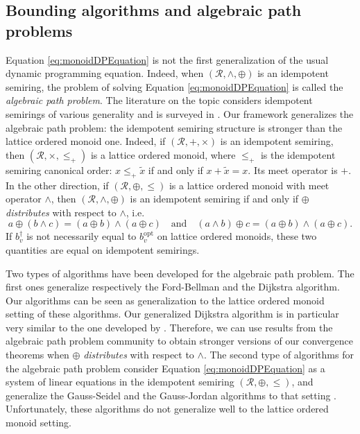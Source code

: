 \documentclass[11pt]{amsart}
\theoremstyle{plain}
\theoremstyle{remark}
\newcommand{\rplus}{\oplus}
\newcommand{\rleq}{\leqslant}
\newcommand{\rset}{\mathcal{R}}
\newcommand{\re}{x}
\newcommand{\meet}{\wedge} \newcommand{\bigmeet}{\bigwedge}
\begin{document}
\subsection{Bounding algorithms and algebraic path problems} \label{sub:bounding_algorithms_and_resource_constrained_shortest_path_problem}



Equation \eqref{eq:monoidDPEquation} is not the first generalization of the usual dynamic programming equation. Indeed, when $(\rset,\meet,\rplus)$ is an idempotent semiring, the problem of solving Equation \eqref{eq:monoidDPEquation} is called the \emph{algebraic path problem}. The literature on the topic considers idempotent semirings of various generality \cite{aho1974design,backhouse1975regular,carre1971algebra,zimmermann1981linear,fink1992survey,gondran2008graphs,lehmann1977algebraic,roy1959transitivite,mohri2002semiring} and is surveyed in \cite{fink1992survey}. Our framework generalizes the algebraic path problem:  the idempotent semiring structure is stronger than the lattice ordered monoid one. Indeed, if $(\rset,+,\times)$ is an idempotent semiring, then $(\rset,\times, \rleq_{+})$ is a lattice ordered monoid, where $\rleq_{+}$ is the idempotent semiring canonical order: $\re \rleq_{+}\tilde{\re}$ if and only if $\re + \tilde{\re} = \re$. Its meet operator is $+$. In the other direction, if $(\rset,\rplus,\rleq)$ is a lattice ordered monoid with meet operator $\meet$, then $(\rset,\meet,\rplus)$ is an idempotent semiring if and only if $\rplus$ \emph{distributes} with respect to $\meet$, i.e.
$$a \rplus (b \meet c) = (a \rplus b) \meet (a \rplus c)  \quad \text{and}\quad (a \meet b) \rplus c = (a\rplus b) \meet (a \rplus c).$$
\noindent If $b_{v}^{\dagger}$ is not necessarily equal to $b_{v}^{\mathrm{opt}}$ on lattice ordered monoids, these two quantities are equal on idempotent semirings.

Two types of algorithms have been developed for the algebraic path problem. The first ones generalize respectively the Ford-Bellman \citep{cousot1977abstract,cousot1979constructive} and the Dijkstra \citep{mohri2002semiring} algorithm. Our algorithms can be seen as generalization to the lattice ordered monoid setting of these algorithms. Our generalized Dijkstra algorithm is in particular very similar to the one developed by \citet{mohri2002semiring}. Therefore, we can use results from the algebraic path problem community to obtain stronger versions of our convergence theorems when $\rplus$ \emph{distributes} with respect to $\meet$. The second type of algorithms for the algebraic path problem consider Equation \eqref{eq:monoidDPEquation} as a system of linear equations in the idempotent semiring $(\rset,\rplus,\rleq)$, and generalize the Gauss-Seidel and the Gauss-Jordan algorithms to that setting \citep{gondran2008graphs,zimmermann1981linear}. Unfortunately, these algorithms do not generalize well to the lattice ordered monoid setting. 
\end{document}
